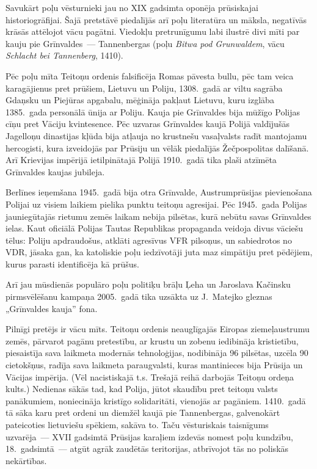 \documentclass[twoside,a5paper,12pt,fleqn,openany]{extbook}
\newcommand{\pltxti}[1]{\textit{\textpolish{#1}}}
\newcommand{\detxti}[1]{\textit{\textgerman{#1}}}
\begin{document}
Savukārt poļu vēsturnieki jau no XIX gadsimta oponēja prūsiskajai historiogrāfijai. Šajā pretstāvē piedalījās arī poļu literatūra un māksla, negatīvās krāsās attēlojot vācu pagātni. Viedokļu pretrunīgumu labi ilustrē divi mīti par kauju pie Grīnvaldes~--- Tannenbergas (poļu \pltxti{Bitwa pod Grunwaldem}, vācu \detxti{Schlacht bei Tannenberg}, 1410).

Pēc poļu mīta Teitoņu ordenis falsificēja Romas pāvesta bullu, pēc tam veica karagājienus pret prūšiem, Lietuvu un Poliju, 1308.~gadā ar viltu sagrāba Gdaņsku un Piejūras apgabalu, mēģināja pakļaut Lietuvu, kuru izglāba 1385.~gada personālā ūnija ar Poliju. Kauja pie Grīnvaldes bija mūžīgo Polijas cīņu pret Vāciju kvintesence. Pēc uzvaras Grīnvaldes kaujā Polijā valdījušās Jagelloņu dinastijas kļūda bija atļauja no krustnešu vasaļvalsts radīt mantojamu hercogisti, kura izveidojās par Prūsiju un vēlāk piedalījās Žečpospolitas dalīšanā. Arī Krievijas impērijā ietilpinātajā Polijā 1910.~gadā tika plaši atzīmēta Grīnvaldes kaujas jubileja.

Berlīnes ieņemšana 1945.~gadā bija otra Grīnvalde, Austrumprūsijas pievienošana Polijai uz visiem laikiem pielika punktu teitoņu agresijai. Pēc 1945.~gada Polijas jauniegūtajās rietumu zemēs laikam nebija pilsētas, kurā nebūtu savas Grīnvaldes ielas. Kaut oficiālā Polijas Tautas Republikas propaganda veidoja divus vāciešu tēlus: Poliju apdraudošus, atklāti agresīvus VFR pilsoņus, un sabiedrotos no VDR, jāsaka gan, ka katoliskie poļu iedzīvotāji juta maz simpātiju pret pēdējiem, kurus parasti identificēja kā prūšus.

Arī jau mūsdienās populāro poļu politiķu brāļu Ļeha un Jaroslava Kačinsku pirmsvēlēšanu kampaņa 2005.~gadā tika uzsākta uz J.~Matejko gleznas „Grīnvaldes kauja” fona.

Pilnīgi pretējs ir vācu mīts. Teitoņu ordenis neauglīgajās Eiropas ziemeļaustrumu zemēs, pārvarot pagānu pretestību, ar krustu un zobenu iedibināja kristietību, piesaistīja sava laikmeta modernās tehnoloģijas, nodibināja 96 pilsētas, uzcēla 90 cietokšņus, radīja sava laikmeta paraugvalsti, kuras mantinieces bija Prūsija un Vācijas impērija. (Vēl nacistiskajā t.s. Trešajā reihā darbojās Teitoņu ordeņa kults.) Nedienas sākās tad, kad Polija, jūtot skaudību pret teitoņu valsts panākumiem, noniecināja kristīgo solidaritāti, vienojās ar pagāniem. 1410.~gadā tā sāka karu pret ordeni un diemžēl kaujā pie Tannenbergas, galvenokārt pateicoties lietuviešu spēkiem, sakāva to. Taču vēsturiskais taisnīgums uzvarēja~--- XVII gadsimtā Prūsijas karaļiem izdevās nomest poļu kundzību, 18.~gadsimtā~--- atgūt agrāk zaudētās teritorijas, atbrīvojot tās no poliskās nekārtības.
\end{document}
